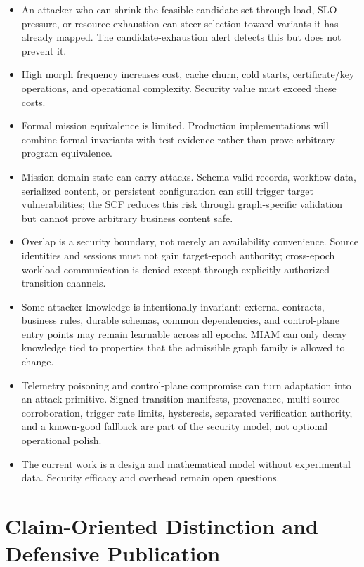 \documentclass[11pt,letterpaper]{article}
\begin{document}
\begin{itemize}[leftmargin=1.5em,itemsep=2pt]
\item An attacker who can shrink the feasible candidate set through load, SLO pressure, or resource exhaustion can steer selection toward variants it has already mapped. The candidate-exhaustion alert detects this but does not prevent it.
\item High morph frequency increases cost, cache churn, cold starts, certificate/key operations, and operational complexity. Security value must exceed these costs.
\item Formal mission equivalence is limited. Production implementations will combine formal invariants with test evidence rather than prove arbitrary program equivalence.
\item Mission-domain state can carry attacks. Schema-valid records, workflow data, serialized content, or persistent configuration can still trigger target vulnerabilities; the SCF reduces this risk through graph-specific validation but cannot prove arbitrary business content safe.
\item Overlap is a security boundary, not merely an availability convenience. Source identities and sessions must not gain target-epoch authority; cross-epoch workload communication is denied except through explicitly authorized transition channels.
\item Some attacker knowledge is intentionally invariant: external contracts, business rules, durable schemas, common dependencies, and control-plane entry points may remain learnable across all epochs. MIAM can only decay knowledge tied to properties that the admissible graph family is allowed to change.
\item Telemetry poisoning and control-plane compromise can turn adaptation into an attack primitive. Signed transition manifests, provenance, multi-source corroboration, trigger rate limits, hysteresis, separated verification authority, and a known-good fallback are part of the security model, not optional operational polish.
\item The current work is a design and mathematical model without experimental data. Security efficacy and overhead remain open questions.
\end{itemize}

\section{Claim-Oriented Distinction and Defensive Publication}
\end{document}
